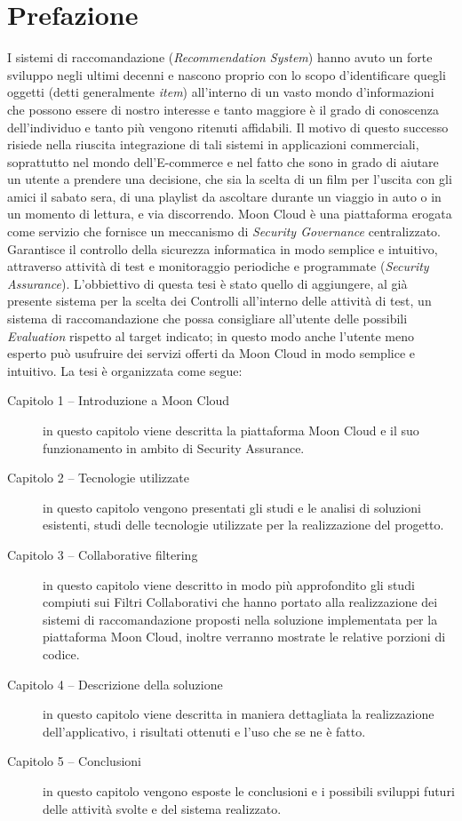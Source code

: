\chapter{Prefazione}\label{chp:00-prefaction}
I sistemi di raccomandazione (\textit{Recommendation System}) hanno avuto un forte sviluppo negli ultimi decenni e 
nascono proprio con lo scopo d'identificare quegli oggetti (detti generalmente \textit{item}) all'interno di un vasto 
mondo d'informazioni che possono essere di nostro interesse e tanto maggiore è il grado di conoscenza dell'individuo 
e tanto più vengono ritenuti affidabili.\hfill\break
Il motivo di questo successo risiede nella riuscita integrazione di tali sistemi in applicazioni commerciali, 
soprattutto nel mondo dell’E-commerce e nel fatto che sono in grado di aiutare un utente a prendere una decisione, che sia la scelta di 
un film per l'uscita con gli amici il sabato sera, di una playlist da ascoltare durante un viaggio in auto o in un momento di lettura, 
e via discorrendo.\hfill\break
Moon Cloud è una piattaforma erogata come servizio che fornisce un meccanismo di \textit{Security Governance} centralizzato. 
Garantisce il controllo della sicurezza informatica in modo semplice e intuitivo, attraverso attività di test e monitoraggio 
periodiche e programmate (\textit{Security Assurance}). L'obbiettivo di questa tesi è stato quello di aggiungere, al già 
presente sistema per la scelta dei Controlli all'interno delle attività di test, un sistema di raccomandazione che possa 
consigliare all'utente delle possibili \textit{Evaluation} rispetto al target indicato; in questo modo anche l'utente meno esperto può 
usufruire dei servizi offerti da Moon Cloud in modo semplice e intuitivo.
\vspace{0.5 cm}
\hfill\break
La tesi è organizzata come segue:
\begin{description}
    \item[Capitolo 1 -- Introduzione a Moon Cloud] in questo capitolo viene descritta la piattaforma Moon Cloud e il suo funzionamento 
    in ambito di Security Assurance.
    \item[Capitolo 2 -- Tecnologie utilizzate] in questo capitolo vengono presentati gli studi e le analisi di soluzioni esistenti, 
    studi delle tecnologie utilizzate per la realizzazione del progetto.
    \item[Capitolo 3 -- Collaborative filtering] in questo capitolo viene descritto in modo più approfondito gli studi compiuti sui 
    Filtri Collaborativi che hanno portato alla realizzazione dei sistemi di raccomandazione proposti nella soluzione implementata 
    per la piattaforma Moon Cloud, inoltre verranno mostrate le relative porzioni di codice.
    \item[Capitolo 4 -- Descrizione della soluzione] in questo capitolo viene descritta in maniera dettagliata la realizzazione 
    dell'applicativo, i risultati ottenuti e l'uso che se ne è fatto.
    \item[Capitolo 5 -- Conclusioni] in questo capitolo vengono esposte le conclusioni e i possibili sviluppi futuri delle attività 
    svolte e del sistema realizzato.
\end{description}
